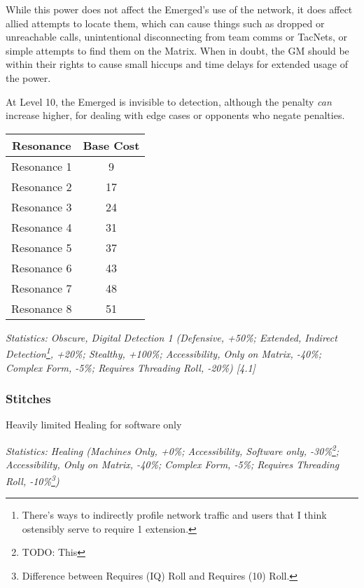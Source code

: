 \begin{multicols*}{3}
	While this power does not affect the Emerged's use of the network, it does affect allied attempts to locate them, which can cause things such as dropped or unreachable calls, unintentional disconnecting from team comms or TacNets, or simple attempts to find them on the Matrix. When in doubt, the GM should be within their rights to cause small hiccups and time delays for extended usage of the power.
	
	At Level 10, the Emerged is invisible to detection, although the penalty \textit{can} increase higher, for dealing with edge cases or opponents who negate penalties.
	
	\begin{center}
		\begin{tabular}{|c|c|}
			\hline
			Resonance & Base Cost\\
			\hline
			\hline
			Resonance 1 & 9 \\
			Resonance 2 & 17 \\
			Resonance 3 & 24 \\
			Resonance 4 & 31 \\
			Resonance 5 & 37 \\
			Resonance 6 & 43 \\
			Resonance 7 & 48 \\
			Resonance 8 & 51 \\
			\hline
		\end{tabular}
	\end{center}	
	
	\textcolor{OliveGreen}{\textit{Statistics: Obscure, Digital Detection 1 (Defensive, +50\%; Extended, Indirect Detection\footnote{There's ways to indirectly profile network traffic and users that I think ostensibly serve to require 1 extension.}, +20\%; Stealthy, +100\%; Accessibility, Only on Matrix, -40\%; Complex Form, -5\%; Requires Threading Roll, -20\%) [4.1]}}
	
	\subsubsection*{Stitches}\label{stitches}
	
	Heavily limited Healing for software only
	
	\textcolor{OliveGreen}{\textit{Statistics: Healing (Machines Only, +0\%; Accessibility, Software only, -30\%\footnote{TODO: This}; Accessibility, Only on Matrix, -40\%; Complex Form, -5\%; Requires Threading Roll, -10\%\footnote{Difference between Requires (IQ) Roll and Requires (10) Roll.}) }}
	

\end{multicols*}
